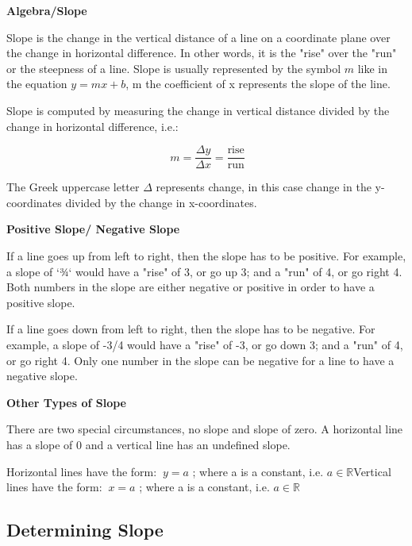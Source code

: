 \textbf{Algebra/Slope}



Slope is the change in the vertical distance of a line on a coordinate plane over the
change in horizontal difference. In other words, it is the "rise" over the "run" or the
steepness of a line. Slope is usually represented by the symbol $m$ like in the equation
$y = mx + b$, m the coefficient of x represents the slope of the line.



Slope is computed by measuring the change in vertical distance divided by the change in
horizontal difference, i.e.:



$$\ m = \frac{\Delta y}{\Delta x} = \frac{\text{rise}}{\text{run}}$$



The Greek uppercase letter $\Delta$ represents change, in this case change in the
y-coordinates divided by the change in x-coordinates.



\textbf{Positive Slope/ Negative Slope}



If a line goes up from left to right, then the slope has to be positive. For example, a
slope of `¾` would have a "rise" of 3, or go up 3; and a "run" of 4, or go right 4. Both
numbers in the slope are either negative or positive in order to have a positive slope.



If a line goes down from left to right, then the slope has to be negative. For example, a
slope of -3/4 would have a "rise" of -3, or go down 3; and a "run" of 4, or go right 4.
Only one number in the slope can be negative for a line to have a negative slope.



\textbf{Other Types of Slope}



There are two special circumstances, no slope and slope of zero. A horizontal line has a
slope of 0 and a vertical line has an undefined slope.



Horizontal lines have the form: $\ y = a$ ; where a is a constant, i.e. $a \in
\mathbb{R}$Vertical lines have the form: $\ x = a$ ; where a is a constant, i.e. $a \in
\mathbb{R}$




\subsection{Determining Slope}
\label{sss:dete-8960}




